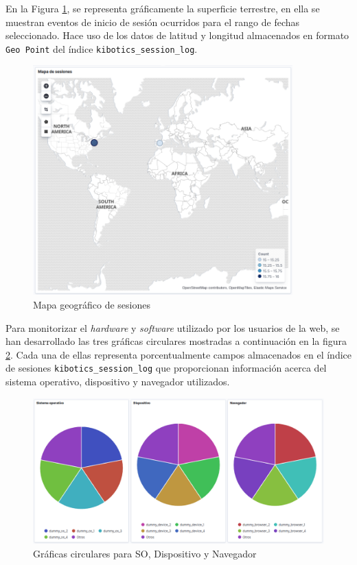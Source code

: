 \documentclass[a4paper, 12pt]{book}
\begin{document}
		En la Figura \ref{fig:kibana_map}, se representa gráficamente la superficie terrestre, en ella se muestran eventos de inicio de sesión ocurridos para el rango de fechas seleccionado. Hace uso de los datos de latitud y longitud almacenados en formato \texttt{Geo Point} del índice \texttt{kibotics\_session\_log}.
		\begin{figure}[H]
			\centering
			\includegraphics[width=10cm, keepaspectratio]{img/kibana_06_map}
			\caption{Mapa geográfico de sesiones}
			\label{fig:kibana_map}
		\end{figure}
		
		Para monitorizar el \textit{hardware} y \textit{software} utilizado por los usuarios de la web, se han desarrollado las tres gráficas circulares mostradas a continuación en la figura \ref{fig:kibana_pie}. Cada una de ellas representa porcentualmente campos almacenados en el índice de sesiones  \texttt{kibotics\_session\_log} que proporcionan información acerca del sistema operativo, dispositivo y navegador utilizados.
		\begin{figure}[H]
			\centering
			\includegraphics[width=14cm, keepaspectratio]{img/kibana_07_pie}
			\caption{Gráficas circulares para SO, Dispositivo y Navegador}
			\label{fig:kibana_pie}
		\end{figure}
		
\end{document}
